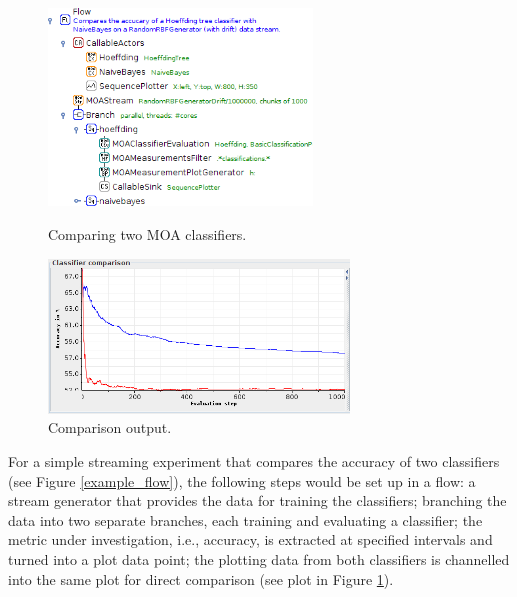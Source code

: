\documentclass[wcp]{jmlr}
\begin{document}
\begin{figure}[htb]
  \begin{minipage}[b]{0.5\linewidth}
  \centering
  \includegraphics[width=7.0cm]{images/example_flow_clipped.png}
  \caption{Comparing two MOA classifiers.}
  \label{example_flow}
  \end{minipage}%
  \begin{minipage}[b]{0.5\linewidth}
  \centering
  \includegraphics[width=8.0cm]{images/example_output_clipped.png}
  \caption{Comparison output.}
  \label{example_output}
  \end{minipage}
\end{figure}

For a simple streaming experiment that compares the accuracy of two classifiers (see Figure \ref{example_flow}), the following steps would be set up in a flow: a stream generator that provides the data for training the classifiers; branching the data into two separate branches, each training and evaluating a classifier; the metric under investigation, i.e., accuracy, is extracted at specified intervals and turned into a plot data point; the plotting data from both classifiers is channelled into the same plot for direct comparison (see plot in Figure \ref{example_output}).
\end{document}
